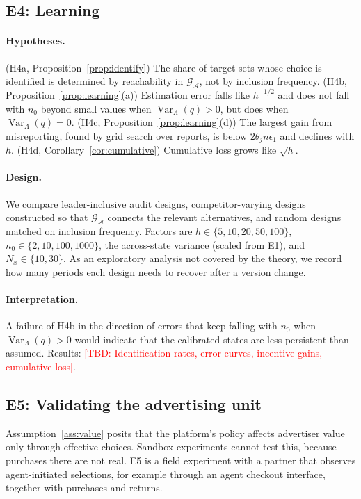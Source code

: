 \documentclass[opre,dblanonrev]{informs4}
\providecommand{\1}{\mathbf{1}}
\providecommand{\Var}{\operatorname{Var}}
\providecommand{\TBD}[1]{\textcolor{red}{[TBD: #1]}}
\begin{document}
\subsection{E4: Learning}\label{sec:exp-learning}

\paragraph{Hypotheses.} (H4a, Proposition~\ref{prop:identify}) The share of target sets whose choice is identified is determined by reachability in $\mathcal G_{\mathcal A}$, not by inclusion frequency. (H4b, Proposition~\ref{prop:learning}(a)) Estimation error falls like $h^{-1/2}$ and does not fall with $n_0$ beyond small values when $\Var_\Lambda(q)>0$, but does when $\Var_\Lambda(q)=0$. (H4c, Proposition~\ref{prop:learning}(d)) The largest gain from misreporting, found by grid search over reports, is below $2\theta_jn\epsilon_1$ and declines with $h$. (H4d, Corollary~\ref{cor:cumulative}) Cumulative loss grows like $\sqrt h$.

\paragraph{Design.} We compare leader-inclusive audit designs, competitor-varying designs constructed so that $\mathcal G_{\mathcal A}$ connects the relevant alternatives, and random designs matched on inclusion frequency. Factors are $h\in\{5,10,20,50,100\}$, $n_0\in\{2,10,100,1000\}$, the across-state variance (scaled from E1), and $N_x\in\{10,30\}$. As an exploratory analysis not covered by the theory, we record how many periods each design needs to recover after a version change.

\paragraph{Interpretation.} A failure of H4b in the direction of errors that keep falling with $n_0$ when $\Var_\Lambda(q)>0$ would indicate that the calibrated states are less persistent than assumed. Results: \TBD{Identification rates, error curves, incentive gains, cumulative loss}.

\subsection{E5: Validating the advertising unit}\label{sec:exp-unit}

Assumption~\ref{ass:value} posits that the platform's policy affects advertiser value only through effective choices. Sandbox experiments cannot test this, because purchases there are not real. E5 is a field experiment with a partner that observes agent-initiated selections, for example through an agent checkout interface, together with purchases and returns.
\end{document}
